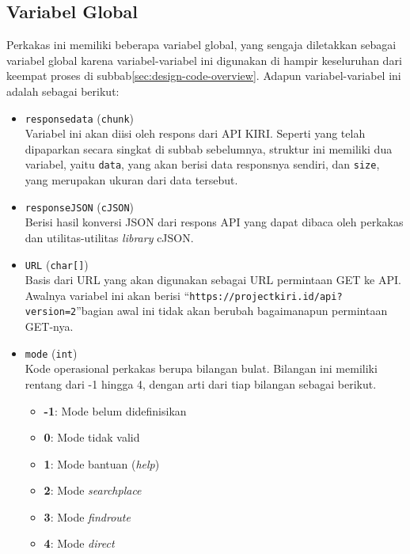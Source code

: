 \subsection{Variabel Global}
\label{sec:design-implementation-globalvars}

Perkakas ini memiliki beberapa variabel global, yang sengaja diletakkan sebagai variabel global karena variabel-variabel ini digunakan di hampir keseluruhan dari keempat proses di subbab\ref{sec:design-code-overview}. Adapun variabel-variabel ini adalah sebagai berikut:

\begin{itemize}
	\item \verb|responsedata| (\verb|chunk|) \\
	Variabel ini akan diisi oleh respons dari API KIRI. Seperti yang telah dipaparkan secara singkat di subbab sebelumnya, struktur ini memiliki dua variabel, yaitu \verb|data|, yang akan berisi data responsnya sendiri, dan \verb|size|, yang merupakan ukuran dari data tersebut.
	\item \verb|responseJSON| (\verb|cJSON|) \\
	Berisi hasil konversi JSON dari respons API yang dapat dibaca oleh perkakas dan utilitas-utilitas \textit{library} cJSON.
	\item \verb|URL| (\verb|char[]|) \\
	Basis dari URL yang akan digunakan sebagai URL permintaan GET ke API. Awalnya variabel ini akan berisi ``\verb|https://projectkiri.id/api?version=2|''\textemdash bagian awal ini tidak akan berubah bagaimanapun permintaan GET-nya.
	\item \verb|mode| (\verb|int|) \\
	Kode operasional perkakas berupa bilangan bulat. Bilangan ini memiliki rentang dari -1 hingga 4, dengan arti dari tiap bilangan sebagai berikut.
	
	\begin{itemize}
		\item \textbf{-1}: Mode belum didefinisikan
		\item \textbf{0}: Mode tidak valid
		\item \textbf{1}: Mode bantuan (\textit{help})
		\item \textbf{2}: Mode \textit{searchplace}
		\item \textbf{3}: Mode \textit{findroute}
		\item \textbf{4}: Mode \textit{direct}
	\end{itemize}
	

\end{itemize}
